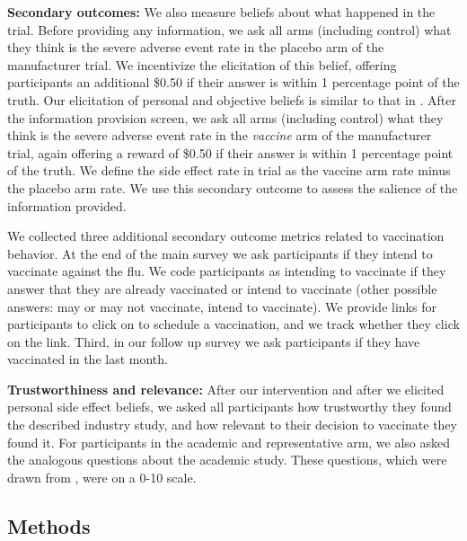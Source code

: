 \textbf{Secondary outcomes:} We also measure beliefs about what happened in the trial. 
Before providing any information, we ask all arms (including control) what they think is 
the severe adverse event rate in the placebo arm of the manufacturer trial. 
We incentivize the elicitation of this belief, offering participants 
an additional \$0.50 if their answer is within 1 percentage point of the truth. 
Our elicitation of personal and objective beliefs is similar to that in 
\citet{roth2024misperceived}. After the information provision screen, we ask all arms (including control) 
what they think is the severe adverse event rate in the {\em vaccine} arm of the 
manufacturer trial, again offering a reward of \$0.50 if their answer is within 1 percentage point of the truth. 
We define the side effect rate in trial as the vaccine arm rate minus the placebo arm rate. 
We use this secondary outcome to assess the salience of the 
information provided.

We collected three additional secondary outcome metrics related to vaccination behavior. 
At the end of the main survey we ask participants if they intend to vaccinate against the flu. 
We code participants as intending to vaccinate if they answer that they are already vaccinated or 
intend to vaccinate (other possible answers: may or may not vaccinate, intend to vaccinate). 
We provide links for participants to click on to schedule a vaccination, and we track whether 
they click on the link. Third, in our follow up survey we ask participants if they have vaccinated 
in the last month.

\textbf{Trustworthiness and relevance:} After our intervention and after we elicited personal side 
effect beliefs, we asked all participants how trustworthy they found the described industry study, 
and how relevant to their decision to vaccinate they found it. For participants in the academic and 
representative arm, we also asked the analogous questions about the academic study. 
These questions, which were drawn from \citet{alsan2024representation}, were on a 0-10 scale.

\subsection{Methods}

